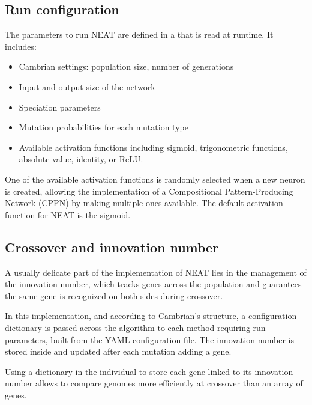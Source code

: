 \subsection{Run configuration}

The parameters to run NEAT are defined in a   that is read at runtime. It includes:

\begin{itemize}
    \item Cambrian settings: population size, number of generations
    \item Input and output size of the network
    \item Speciation parameters
    \item Mutation probabilities for each mutation type
    \item Available activation functions including sigmoid, trigonometric functions, absolute value, identity, or ReLU. 
\end{itemize}

One of the available activation functions is randomly selected when a new neuron is created, allowing the implementation of a Compositional Pattern-Producing Network (CPPN) by making multiple ones available. The default activation function for NEAT is the sigmoid. 

\subsection{Crossover and innovation number}
A usually delicate part of the implementation of NEAT lies in the management of the innovation number, which tracks genes across the population and guarantees the same gene is recognized on both sides during crossover.

In this implementation, and according to Cambrian's structure, a configuration dictionary is passed across the algorithm to each method requiring run parameters, built from the YAML configuration file. The innovation number is stored inside and updated after each mutation adding a gene. 

Using a dictionary in the individual to store each gene linked to its innovation number allows to compare genomes more efficiently at crossover than an array of genes. 

